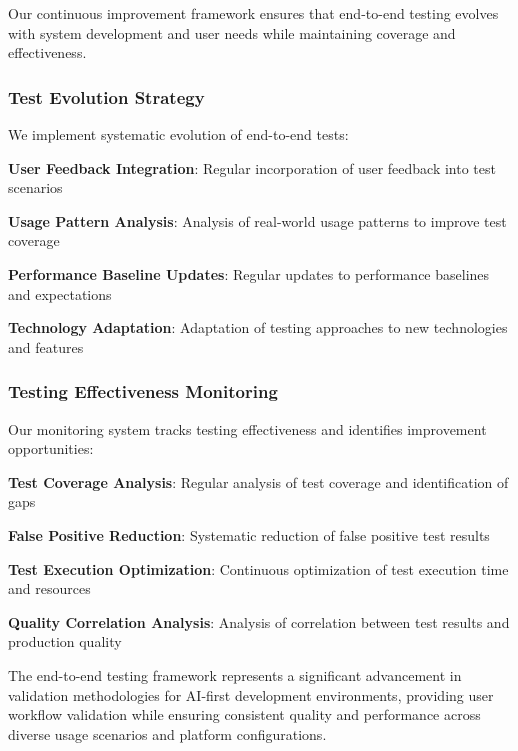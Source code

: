 Our continuous improvement framework ensures that end-to-end testing evolves with system development and user needs while maintaining coverage and effectiveness.

\subsubsection*{Test Evolution Strategy}

We implement systematic evolution of end-to-end tests:

\begin{compactlist}
    \item \textbf{User Feedback Integration}: Regular incorporation of user feedback into test scenarios
    \item \textbf{Usage Pattern Analysis}: Analysis of real-world usage patterns to improve test coverage
    \item \textbf{Performance Baseline Updates}: Regular updates to performance baselines and expectations
    \item \textbf{Technology Adaptation}: Adaptation of testing approaches to new technologies and features
\end{compactlist}

\subsubsection*{Testing Effectiveness Monitoring}

Our monitoring system tracks testing effectiveness and identifies improvement opportunities:

\begin{expandedlist}
    \item \textbf{Test Coverage Analysis}: Regular analysis of test coverage and identification of gaps
    \item \textbf{False Positive Reduction}: Systematic reduction of false positive test results
    \item \textbf{Test Execution Optimization}: Continuous optimization of test execution time and resources
    \item \textbf{Quality Correlation Analysis}: Analysis of correlation between test results and production quality
\end{expandedlist}

The end-to-end testing framework represents a significant advancement in validation methodologies for AI-first development environments, providing user workflow validation while ensuring consistent quality and performance across diverse usage scenarios and platform configurations.
